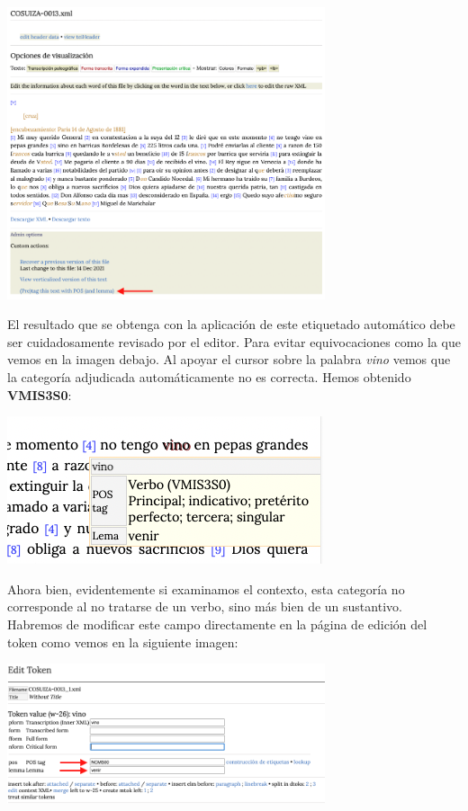 \documentclass[
]{book}
\begin{document}
\includegraphics[width=0.7\textwidth,height=\textheight]{img/pos.png}

El resultado que se obtenga con la aplicación de este etiquetado automático debe ser cuidadosamente revisado por el editor. Para evitar equivocaciones como la que vemos en la imagen debajo. Al apoyar el cursor sobre la palabra \emph{vino} vemos que la categoría adjudicada automáticamente no es correcta. Hemos obtenido \textbf{VMIS3S0}:

\includegraphics{img/tok.png}

Ahora bien, evidentemente si examinamos el contexto, esta categoría no corresponde al no tratarse de un verbo, sino más bien de un sustantivo. Habremos de modificar este campo directamente en la página de edición del token como vemos en la siguiente imagen:

\includegraphics[width=0.7\textwidth,height=\textheight]{img/posmod.png}
\end{document}
